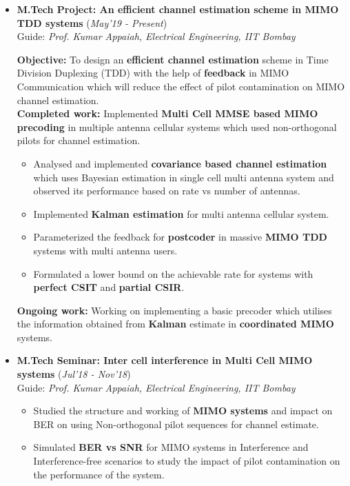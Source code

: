 \documentclass[10pt]{article}
\begin{document}
\begin{itemize}[leftmargin=0.4cm]
\item \textbf{M.Tech Project: An efficient channel estimation scheme in MIMO TDD systems}
\hfill{(\textit{May'19 - Present})} \\
Guide: \textit{Prof. Kumar Appaiah, Electrical Engineering, IIT Bombay}


  \textbf{Objective:} To design an \textbf{efficient channel estimation} scheme in Time Division Duplexing (TDD) with the help of \textbf{feedback} in MIMO Communication which will reduce the effect of pilot contamination on MIMO channel estimation.\\
%
%
\textbf{Completed work:} Implemented \textbf{Multi Cell MMSE based MIMO precoding} in multiple antenna cellular systems which used non-orthogonal pilots for channel estimation.

\begin{itemize}

\item Analysed and implemented \textbf{covariance based channel estimation} which uses Bayesian estimation in single cell multi antenna system and observed its performance based on rate vs number of antennas.

\item Implemented \textbf{Kalman estimation} for multi antenna cellular system.  

\item Parameterized the feedback for \textbf{postcoder} in massive \textbf{MIMO TDD} systems with multi antenna users. 

\item Formulated a lower bound on the achievable rate for systems with \textbf{perfect CSIT} and \textbf{partial CSIR}.

\end{itemize}


%
\textbf{Ongoing work:} Working on implementing a basic precoder which utilises the information obtained from \textbf{Kalman} estimate in \textbf{coordinated MIMO} systems.


\item \textbf{M.Tech Seminar: Inter cell interference in Multi Cell MIMO systems 
} 
\hfill{(\textit{Jul'18 - Nov'18})}\\
Guide: \textit{Prof. Kumar Appaiah, Electrical Engineering, IIT Bombay}
	\begin{itemize}
	\item Studied the structure and working of \textbf{MIMO systems} and impact on BER on using Non-orthogonal pilot sequences for channel estimate.
	\item Simulated \textbf{BER vs SNR} for MIMO systems in Interference and Interference-free scenarios to study the impact of pilot contamination on the performance of the system.

	\end{itemize}
	

\end{itemize}
\end{document}
